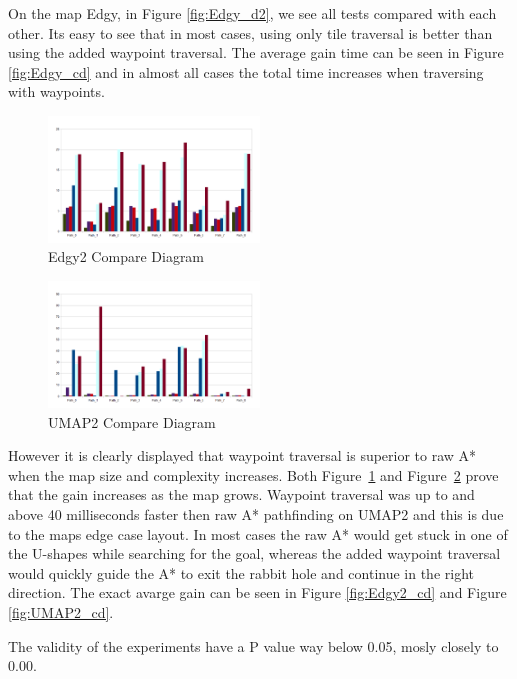 \documentclass[a4paper]{article}
\begin{document}
On the map Edgy, in Figure \ref{fig:Edgy_d2}, we see all tests compared with each other. Its easy to see that in most cases, using only tile traversal is better than using the added waypoint traversal.
The average gain time can be seen in Figure \ref{fig:Edgy_cd} and in almost all cases the total time increases when traversing with waypoints.
	
\begin{figure}[h!]
\centering
\includegraphics[width=0.5\textwidth,height=\textheight,keepaspectratio]{ChartsAndFigures/Edgy2_d2.png}
\caption{Edgy2 Compare Diagram}
\label{fig:Edgy2_d2}
\end{figure}

\begin{figure}[h!]
\centering
\includegraphics[width=0.5\textwidth,height=\textheight,keepaspectratio]{ChartsAndFigures/UMAP2_d2.png}
\caption{UMAP2 Compare Diagram}
\label{fig:UMAP2_d2}
\end{figure}

However it is clearly displayed that waypoint traversal is superior to raw A* when the map size and complexity increases. Both Figure~\ref{fig:Edgy2_d2} and Figure~\ref{fig:UMAP2_d2} prove that the gain increases as the map grows.
Waypoint traversal was up to and above 40 milliseconds faster then raw A* pathfinding on UMAP2 and this is due to the maps edge case layout. In most cases the raw A* would get stuck in one of the U-shapes while searching for the goal, whereas the added waypoint traversal would quickly guide the A* to exit the rabbit hole and continue in the right direction. The exact avarge gain can be seen in Figure \ref{fig:Edgy2_cd} and Figure \ref{fig:UMAP2_cd}.
	
The validity of the experiments have a P value way below 0.05, mosly closely to 0.00.
\end{document}
